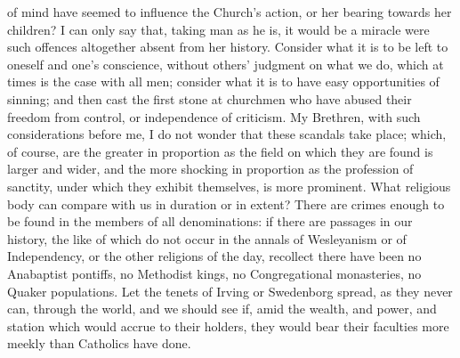 of mind have seemed to influence the Church's action, or
her bearing towards her children? I can only say that,
taking man as he is, it would be a miracle were such
offences altogether absent from her history. Consider
what it is to be left to oneself and one's conscience,
without others' judgment on what we do, which at times is
the case with all men; consider what it is to have easy
opportunities of sinning; and then cast the first stone
at churchmen who have abused their freedom from control,
or independence of criticism. My Brethren, with such
considerations before me, I do not wonder that these
scandals take place; which, of course, are the greater in
proportion as the field on which they are found is larger
and wider, and the more shocking in proportion as the
profession of sanctity, under which they exhibit
themselves, is more prominent. What religious body can
compare with us in duration or in extent? There are
crimes enough to be found in the members of all
denominations: if there are passages in our history, the
like of which do not occur in the annals of Wesleyanism
or of Independency, or the other religions of the day,
recollect there have been no Anabaptist pontiffs, no
Methodist kings, no Congregational monasteries, no Quaker
populations. Let the tenets of Irving or Swedenborg
spread, as they never can, through the world, and we
should see if, amid the wealth, and power, and station
which would accrue to their holders, they would bear
their faculties more meekly than Catholics have done.

